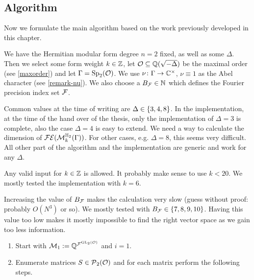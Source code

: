 \subsection{Algorithm}

Now we formulate the main algorithm based on the work previously developed in this chapter.

\begin{algo}
\label{main-algo}
We have the Hermitian modular form degree $n = 2$ fixed, as well as some $\Delta$. Then we select some form weight $k \in \mathbb{Z}$, let $\mathcal{O} \subseteq \mathbb{Q}(\sqrt{-\Delta})$ be the maximal order (see \cref{maxorder}) and let $\Gamma = \operatorname{Sp}_2(\mathcal{O})$. We use $\nu \colon \Gamma \rightarrow \mathbb{C}^\times$, $\nu \equiv 1$ as the Abel character (see \cref{remark-nu}). We also choose a $B_{\mathcal{F}} \in \mathbb{N}$ which defines the Fourier precision index set $\mathcal{F}$.

Common values at the time of writing are $\Delta \in \Set{3,4,8}$. In the implementation, at the time of the hand over of the thesis, only the implementation of $\Delta = 3$ is complete, also the case $\Delta = 4$ is easy to extend. We need a way to calculate the dimension of $\mathcal{FE}(\operatorname{\mathcal{M}}^{\mathbb{H}_{2}}_{k} (\Gamma))$. For other cases, e.g. $\Delta = 8$, this seems very difficult. All other part of the algorithm and the implementation are generic and work for any $\Delta$.

Any valid input for $k \in \mathbb{Z}$ is allowed. It probably make sense to use $k < 20$. We mostly tested the implementation with $k = 6$.

Increasing the value of $B_{\mathcal{F}}$ makes the calculation very slow (guess without proof: probably $O(N^3)$ or so). We mostly tested with $B_\F \in \Set{7,8,9,10}$. Having this value too low makes it mostly impossible to find the right vector space as we gain too less information.

\begin{enumerate}
\item
Start with $\mathcal{M}_1 := \mathbb{Q}^{{\mathcal{F}}^{\operatorname{GL}_2(\mathcal{O})}}$ and $i=1$.

\item\label{NextSStep} Enumerate matrices $S \in \operatorname{\mathcal{P}}_2(\mathcal{O})$ and for each matrix perform the following steps.



\end{enumerate}
\end{algo}
